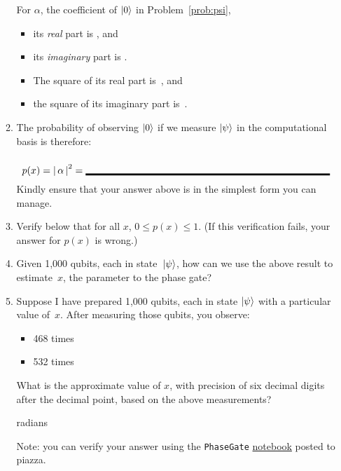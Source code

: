 \documentclass[12pt]{article}
\begin{document}
\begin{enumerate}
\begin{enumerate}[label=\theenumi.\arabic*]
  For $\alpha$, the coefficient of $\ket{0}$ in Problem~\ref{prob:psi},
  \begin{itemize}
      \item its \emph{real} part is \Blank[20em]{}, and
      \item its \emph{imaginary} part is \Blank[20em]{}.
      \item The square of its real part is~\Blank[20em]{}, and
      \item the square of its imaginary part is~\Blank[20em]{}.
  \end{itemize}
  \item\label{prob:prob} The probability of observing $\ket{0}$ if we measure $\ket{\psi}$ in the computational basis is therefore:
  \[
  p(x) = \Prob{\alpha} = \Blank[25em]{}
  \]
  Kindly ensure that your answer above is in the simplest form you can manage.
  \item Verify below that for all $x$, $0 \leq p(x) \leq 1$.  (If this verification fails, your answer for $p(x)$ is wrong.)
  \LeaveSpace{}
  \item Given 1,000 qubits, each in state~$\ket{\psi}$, how can we use the above result to estimate~$x$, the parameter to the phase gate?
  \LeaveSpace{}
  \item Suppose I have prepared 1,000 qubits, each in state $\ket{\psi}$ with a particular value of~$x$. After measuring those qubits, you observe:
  \begin{itemize}
      \item \QZero{} 468 times
      \item \QOne{} 532 times
  \end{itemize}
  What is the approximate value of $x$, with precision of six decimal digits after the decimal point, based on the above measurements?
  
  \Blank[15em]{} radians

  Note: you can verify your answer using the \texttt{PhaseGate} \href{https://piazza.com/class/m5mjpzl3hch1cf/post/76}{notebook} posted to piazza.
\end{enumerate}
\end{enumerate}
\end{document}
